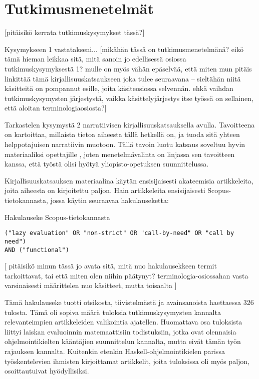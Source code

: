 \section{Tutkimusmenetelmät}\label{metodologia}

[pitäisikö kerrata tutkimuskysymykset tässä?]

Kysymykseen 1 vastatakseni... [mikähän tässä on tutkimusmenetelmänä? eikö tämä hieman leikkaa sitä, mitä sanoin jo edellisessä osiossa tutkimuskysymyksestä 1? mulle on myös vähän epäselvää, että miten mun pitäis linkittää tämä kirjallisuuskatsaukseen joka tulee seuraavana – sieltähän niitä käsitteitä on pompannut esille, joita käsiteosiossa selvennän. ehkä vaihdan tutkimuskysymysten järjestystä, vaikka käsittelyjärjestys itse työssä on sellainen, että aloitan terminologiaosiosta?]

Tarkastelen kysymystä 2 narratiivisen kirjallisuuskatsauksella avulla. Tavoitteena on kartoittaa, millaista tietoa aiheesta tällä hetkellä on, ja tuoda sitä yhteen helppotajuisen narratiivin muotoon. Tällä tavoin luotu katsaus soveltuu hyvin materiaaliksi opettajille \citep[s. 312]{baumeister1997writing}, joten menetelmävalinta on linjassa sen tavoitteen kanssa, että työstä olisi hyötyä yliopisto-opetuksen suunnittelussa.

Kirjallisuuskatsauksen materiaalina käytän ensisijaisesti akateemisia artikkeleita, joita aiheesta on kirjoitettu paljon. Hain artikkeleita ensisijaisesti Scopus-tietokannasta, jossa käytin seuraavaa hakulauseketta:

\begin{listing}[H]
  \caption{Hakulauseke Scopus-tietokannasta}
  \bigskip
  \begin{verbatim}
("lazy evaluation" OR "non-strict" OR "call-by-need" OR "call by need")
AND ("functional")
  \end{verbatim}
\end{listing}

[ pitäisikö minun tässä jo avata sitä, mitä nuo hakulausekkeen termit tarkoittavat, tai että miten olen niihin päätynyt? terminologia-osiossahan vasta varsinaisesti määrittelen nuo käsitteet, mutta toisaalta ]

Tämä hakulauseke tuotti otsikosta, tiivistelmästä ja avainsanoista haettaessa 326 tulosta. Tämä oli sopiva määrä tuloksia tutkimuskysymysten kannalta relevanteimpien artikkeleiden valikointia ajatellen. Huomattava osa tuloksista liittyi laiskan evaluoinnin matemaattisiin todistuksiin, jotka ovat olennaisia ohjelmointikielten kääntäjien suunnittelun kannalta, mutta eivät tämän työn rajauksen kannalta. Kuitenkin etenkin Haskell-ohjelmointikielen parissa työskentelevien ihmisten kirjoittamat artikkelit, joita tuloksissa oli myös paljon, osoittautuivat hyödyllisiksi.

